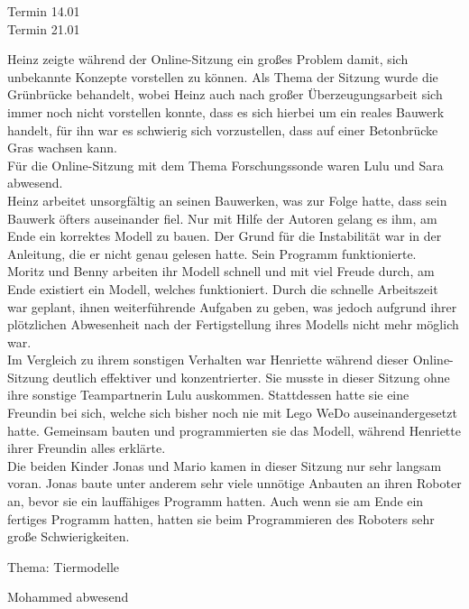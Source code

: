 Termin 14.01\\


Termin 21.01


Heinz zeigte während der Online-Sitzung ein großes Problem damit, sich unbekannte Konzepte vorstellen zu können. Als Thema der Sitzung wurde die Grünbrücke behandelt, wobei Heinz auch nach großer Überzeugungsarbeit sich immer noch nicht vorstellen konnte, dass es sich hierbei um ein reales Bauwerk handelt, für ihn war es schwierig sich vorzustellen, dass auf einer Betonbrücke Gras wachsen kann.\\


Für die Online-Sitzung mit dem Thema Forschungssonde waren Lulu und Sara abwesend.\\
Heinz arbeitet unsorgfältig an seinen Bauwerken, was zur Folge hatte, dass sein Bauwerk öfters auseinander fiel. Nur mit Hilfe der Autoren gelang es ihm, am Ende ein korrektes Modell zu bauen. Der Grund für die Instabilität war in der Anleitung, die er nicht genau gelesen hatte. Sein Programm funktionierte.\\
Moritz und Benny arbeiten ihr Modell schnell und mit viel Freude durch, am Ende existiert ein Modell, welches funktioniert. Durch die schnelle Arbeitszeit war geplant, ihnen weiterführende Aufgaben zu geben, was jedoch aufgrund ihrer plötzlichen Abwesenheit nach der Fertigstellung ihres Modells nicht mehr möglich war.\\
Im Vergleich zu ihrem sonstigen Verhalten war Henriette während dieser Online-Sitzung deutlich effektiver und konzentrierter. Sie musste in dieser Sitzung ohne ihre sonstige Teampartnerin Lulu auskommen. Stattdessen hatte sie eine Freundin bei sich, welche sich bisher noch nie mit Lego WeDo auseinandergesetzt hatte. Gemeinsam bauten und programmierten sie das Modell, während Henriette ihrer Freundin alles erklärte.\\
Die beiden Kinder Jonas und Mario kamen in dieser Sitzung nur sehr langsam voran. Jonas baute unter anderem sehr viele unnötige Anbauten an ihren Roboter an, bevor sie ein lauffähiges Programm hatten. Auch wenn sie am Ende ein fertiges Programm hatten, hatten sie beim Programmieren des Roboters sehr große Schwierigkeiten.


Thema: Tiermodelle

Mohammed abwesend

